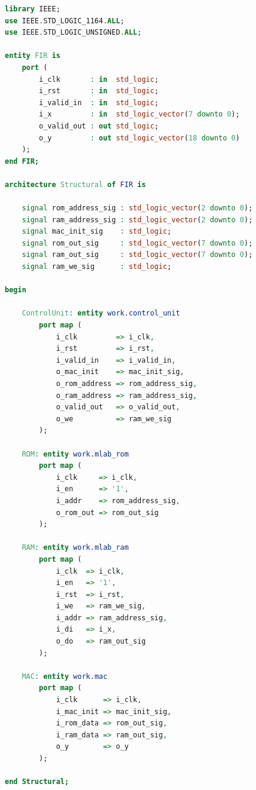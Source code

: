 \documentclass[12pt]{article}
\begin{document}
\begin{lstlisting}[language=VHDL]
library IEEE;
use IEEE.STD_LOGIC_1164.ALL;
use IEEE.STD_LOGIC_UNSIGNED.ALL;

entity FIR is
    port (
        i_clk       : in  std_logic;
        i_rst       : in  std_logic;
        i_valid_in  : in  std_logic;
        i_x         : in  std_logic_vector(7 downto 0);
        o_valid_out : out std_logic;
        o_y         : out std_logic_vector(18 downto 0)
    );
end FIR;

architecture Structural of FIR is

    signal rom_address_sig : std_logic_vector(2 downto 0);
    signal ram_address_sig : std_logic_vector(2 downto 0);
    signal mac_init_sig    : std_logic;
    signal rom_out_sig     : std_logic_vector(7 downto 0);
    signal ram_out_sig     : std_logic_vector(7 downto 0);
    signal ram_we_sig      : std_logic;

begin

    ControlUnit: entity work.control_unit
        port map (
            i_clk         => i_clk,
            i_rst         => i_rst,
            i_valid_in    => i_valid_in,
            o_mac_init    => mac_init_sig,
            o_rom_address => rom_address_sig,
            o_ram_address => ram_address_sig,
            o_valid_out   => o_valid_out,
            o_we          => ram_we_sig
        );

    ROM: entity work.mlab_rom
        port map (
            i_clk     => i_clk,
            i_en      => '1',
            i_addr    => rom_address_sig,
            o_rom_out => rom_out_sig
        );

    RAM: entity work.mlab_ram
        port map (
            i_clk  => i_clk,
            i_en   => '1',
            i_rst  => i_rst,
            i_we   => ram_we_sig,
            i_addr => ram_address_sig,
            i_di   => i_x,
            o_do   => ram_out_sig
        );

    MAC: entity work.mac
        port map (
            i_clk      => i_clk,
            i_mac_init => mac_init_sig,
            i_rom_data => rom_out_sig,
            i_ram_data => ram_out_sig,
            o_y        => o_y
        );

end Structural;
\end{lstlisting}

\newpage
\end{document}
